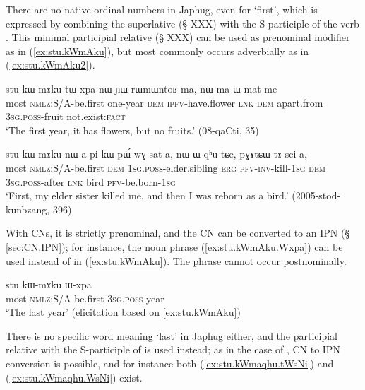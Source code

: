  There are no native ordinal numbers in Japhug, even for `first', which is expressed by combining the superlative  (§ XXX) with the S-participle of the verb . This minimal participial relative  (§ XXX) can be used as prenominal modifier as in (\ref{ex:stu.kWmAku}), but most commonly occurs adverbially as in (\ref{ex:stu.kWmAku2}).   
 
\begin{exe}
\ex  \label{ex:stu.kWmAku}
\gll stu kɯ-mɤku tɯ-xpa nɯ ɲɯ-rɯmɯntoʁ ma, nɯ ma ɯ-mat me \\
most \textsc{nmlz}:S/A-be.first one-year \textsc{dem} \textsc{ipfv}-have.flower \textsc{lnk} \textsc{dem} apart.from \textsc{3sg}.\textsc{poss}-fruit not.exist:\textsc{fact} \\
\glt `The first year, it has flowers, but no fruits.' (08-qaCti, 35)
\end{exe}
  
\begin{exe}
\ex  \label{ex:stu.kWmAku2}
\gll stu kɯ-mɤku nɯ a-pi kɯ pɯ́-wɣ-sat-a,  nɯ ɯ-qʰu tɕe, pɣɤtɕɯ tɤ-sci-a, \\
most \textsc{nmlz}:S/A-be.first \textsc{dem} \textsc{1sg}.\textsc{poss}-elder.sibling \textsc{erg} \textsc{pfv}-\textsc{inv}-kill-\textsc{1sg} \textsc{dem} \textsc{3sg}.\textsc{poss}-after \textsc{lnk} bird \textsc{pfv}-be.born-\textsc{1sg} \\
\glt `First, my elder sister killed me, and then I was reborn as a bird.' (2005-stod-kunbzang, 396)
\end{exe}

With CNs, it is strictly prenominal, and the CN can be converted to an IPN (§ \ref{sec:CN.IPN}); for instance, the noun phrase (\ref{ex:stu.kWmAku.Wxpa}) can be used instead of  in (\ref{ex:stu.kWmAku}). The phrase  cannot occur postnominally.

\begin{exe}
\ex  \label{ex:stu.kWmAku.Wxpa}
\gll  stu kɯ-mɤku ɯ-xpa \\
 most \textsc{nmlz}:S/A-be.first \textsc{3sg}.\textsc{poss}-year  \\
\glt  `The last year' (elicitation based on \ref{ex:stu.kWmAku})
\end{exe}

There is no specific word meaning `last' in Japhug either, and the participial relative   with the S-participle of  is used instead; as in the case of , CN to IPN conversion is possible, and for instance both (\ref{ex:stu.kWmaqhu.tWsNi}) and (\ref{ex:stu.kWmaqhu.WsNi}) exist.

